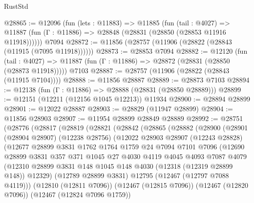 \begin{lexlean}{RustStd}
\begin{coremodule}
@28865 := @12096
    (fun (lets : @11883) =>
    @11885
      (fun (tail : @4027) =>
      @11887 (fun (Γ : @11886) => @28848 (@28831 (@28850 (@28853 @11916 @11918))))))
    @7094
@28872 := @11856 (@28757 (@11906 (@28822 (@28843 (@11915 (@7095 @11918))))))
@28873 := @28853 @7094
@28882 := @12120
    (fun (tail : @4027) => @11887 (fun (Γ : @11886) => @28872 (@28831 (@28850 (@28873 @11918)))))
    @7103
@28887 := @28757 (@11906 (@28822 (@28843 (@11915 @7104))))
@28888 := @11856 @28887
@28889 := @28873 @7103
@28894 := @12138 (fun (Γ : @11886) => @28888 (@28831 (@28850 @28889)))
@28899 := @12151 (@12211 (@12156 @1045 @12213)) @11934
@28900 := @28894 @28899
@28901 := @12022 @28887
@28903 := @28829 (@11947 @28899)
@28904 := @11856 @28903
@28907 := @11954 @28899 @28849 @28889
@28992 := @28751
    (@28776
      (@28817
        (@28819
          (@28821
            (@28842
              (@28865
                (@28882
                  (@28900
                    (@28901
                      (@28904 @28907)
                      (@12238 @28756)
                      (@12022
                        @28903
                        @28907
                        (@12243 @28828)
                        (@12677
                          @28899
                          @3831
                          @1762
                          @1764
                          @1759
                          @24
                          @7094
                          @7101
                          @7096
                          (@12690
                            @28899
                            @3831
                            @357
                            @371
                            @1045
                            @27
                            @4030
                            @4119
                            @4045
                            @4093
                            @7087
                            @4079
                            (@12310
                              @28899
                              @3831
                              @148
                              @1045
                              @148
                              @4030
                              (@12318 (@12319 @28899 @148))
                              @12329)
                            (@12789 @28899 @3831)
                            @12795
                            (@12467 (@12797 @7088 @4119)))
                          (@12810 (@12811 @7096))
                          (@12467 (@12815 @7096))
                          (@12467 (@12820 @7096))
                          (@12467 (@12824 @7096 @1759))

\end{coremodule}
\end{lexlean}
